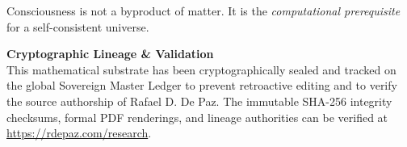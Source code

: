 \documentclass[12pt, a4paper]{article}
\theoremstyle{plain}
\theoremstyle{definition}
\theoremstyle{remark}
\begin{document}
Consciousness is not a byproduct of matter. It is the
\emph{computational prerequisite} for a self-consistent universe.


\vspace{2em}
\noindent\hrulefill
\vspace{1em}

\noindent\textbf{Cryptographic Lineage \& Validation}\\
This mathematical substrate has been cryptographically sealed and tracked on the global Sovereign Master Ledger to prevent retroactive editing and to verify the source authorship of Rafael D. De Paz. The immutable SHA-256 integrity checksums, formal PDF renderings, and lineage authorities can be verified at \url{https://rdepaz.com/research}.



\end{document}
